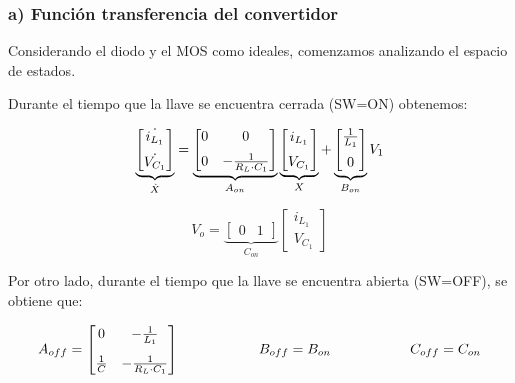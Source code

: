 \documentclass[e4_tp2_main.tex]{subfiles}
\begin{document}
\subsubsection*{a) Funci\'on transferencia del convertidor}

Considerando el diodo y el MOS como ideales, comenzamos analizando el espacio de estados. 

Durante el tiempo que la llave se encuentra cerrada (SW=ON) obtenemos:

\begin{equation}
\underbrace{
\begin{bmatrix}
\dot{i_{L_1}} \vspace{0.2cm} \\
\dot{V_{C_1}} 
\end{bmatrix}
}_{\dot{X}}
=
\underbrace{
\begin{bmatrix}
{0} & {0} \vspace{0.2cm}\\
{0} & {-\frac{1}{R_L \cdot C_1}} 
\end{bmatrix}
}_{A_{on}}
\underbrace{
\begin{bmatrix}
{i_{L_1}} \vspace{0.2cm}\\
{V_{C_1}} 
\end{bmatrix}
}_{X}
+
\underbrace{
\begin{bmatrix}
{\frac{1}{L_1}} \vspace{0.2cm}\\
{0} 
\end{bmatrix}
}_{B_{on}}
V_1
\end{equation}


\begin{equation}
V_o =
\underbrace{
\begin{bmatrix}
{0} & {1} 
\end{bmatrix}
}_{C_{on}}
\begin{bmatrix}
{i_{L_1}} \\
{V_{C_1}} 
\end{bmatrix}
\end{equation}

Por otro lado, durante el tiempo que la llave se encuentra abierta (SW=OFF), se obtiene que: 

\begin{equation}
A_{off} = 
\begin{bmatrix}
{0} & {- \frac{1}{L_1}} \vspace{0.3cm}\\ 
{\frac{1}{C}} & {-\frac{1}{R_L \cdot C_1}}
\end{bmatrix}  
\hspace{2cm} B_{off}=B_{on}  
\hspace{2cm} C_{off} = C_{on}
\end{equation}
\end{document}
